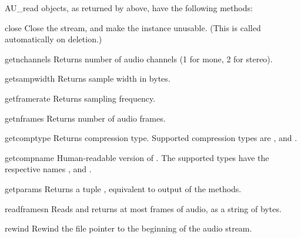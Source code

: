 AU_read objects, as returned by  above, have the
following methods:

\begin{methoddesc}[AU_read]{close}{}
Close the stream, and make the instance unusable. (This is 
called automatically on deletion.)
\end{methoddesc}

\begin{methoddesc}[AU_read]{getnchannels}{}
Returns number of audio channels (1 for mone, 2 for stereo).
\end{methoddesc}

\begin{methoddesc}[AU_read]{getsampwidth}{}
Returns sample width in bytes.
\end{methoddesc}

\begin{methoddesc}[AU_read]{getframerate}{}
Returns sampling frequency.
\end{methoddesc}

\begin{methoddesc}[AU_read]{getnframes}{}
Returns number of audio frames.
\end{methoddesc}

\begin{methoddesc}[AU_read]{getcomptype}{}
Returns compression type.
Supported compression types are ,  and .
\end{methoddesc}

\begin{methoddesc}[AU_read]{getcompname}{}
Human-readable version of . 
The supported types have the respective names ,  and .
\end{methoddesc}

\begin{methoddesc}[AU_read]{getparams}{}
Returns a tuple ,
equivalent to output of the  methods.
\end{methoddesc}

\begin{methoddesc}[AU_read]{readframes}{n}
Reads and returns at most  frames of audio, as a string of bytes.
\end{methoddesc}

\begin{methoddesc}[AU_read]{rewind}{}
Rewind the file pointer to the beginning of the audio stream.
\end{methoddesc}

